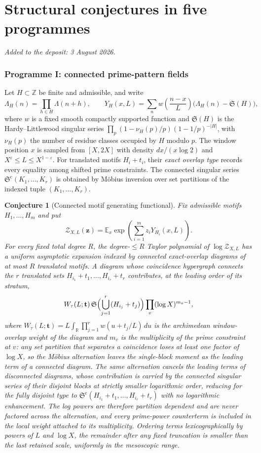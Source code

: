 \documentclass[11pt]{article}
\newtheorem{conjecture}{Conjecture}
\theoremstyle{definition}
\newcommand{\SG}{\mathfrak S}
\newcommand{\E}{\mathbb E}
\newcommand{\Z}{\mathbb Z}
\newcommand{\R}{\mathbb R}
\newcommand{\eps}{\varepsilon}
\providecommand{\Z}{\mathbb Z}
\providecommand{\R}{\mathbb R}
\providecommand{\E}{\mathbb E}
\begin{document}
\part{Structural conjectures in five programmes}

\medskip\noindent\emph{Added to the deposit: 3 August 2026.}\par\medskip

\section{Programme I: connected prime-pattern fields}

Let $H\subset\Z$ be finite and admissible, and write
\[
 \Lambda_H(n)=\prod_{h\in H}\Lambda(n+h),\qquad
 Y_H(x,L)=\sum_n w\!\left(\frac{n-x}{L}\right)
 \bigl(\Lambda_H(n)-\SG(H)\bigr),
\]
where $w$ is a fixed smooth compactly supported function and $\SG(H)$ is the
Hardy--Littlewood singular series
$\prod_p(1-\nu_H(p)/p)(1-1/p)^{-|H|}$, with $\nu_H(p)$ the number of residue
classes occupied by $H$ modulo $p$.  The window position $x$ is
sampled from $[X,2X]$ with density $dx/(x\log2)$ and
$X^\eps\le L\le X^{1-\eps}$.  For translated motifs $H_i+t_i$, their \emph{exact
overlap type} records every equality among shifted prime constraints.  The connected
singular series $\SG^{\mathrm c}(K_1,\ldots,K_r)$ is obtained by M\"obius inversion over
set partitions of the indexed tuple $(K_1,\ldots,K_r)$.

\begin{conjecture}[Connected motif generating functional]\label{s1}
Fix admissible motifs $H_1,\ldots,H_m$ and put
\[
 \mathcal Z_{X,L}(\mathbf z)=
 \E_x\exp\!\left(\sum_{i=1}^m z_iY_{H_i}(x,L)\right).
\]
For every fixed total degree $R$, the degree-$\le R$ Taylor polynomial of
$\log\mathcal Z_{X,L}$ has a uniform asymptotic expansion indexed by connected exact-overlap diagrams of at most $R$ translated motifs.  A diagram whose coincidence hypergraph connects the $r$ translated sets
$H_{i_1}+t_1,\ldots,H_{i_r}+t_r$ contributes, at the leading order of its stratum,
\[
 W_\tau(L;\mathbf t)\,
 \SG\Bigl(\bigcup_{j=1}^r(H_{i_j}+t_j)\Bigr)
 \prod_v(\log X)^{m_v-1},
\]
where $W_\tau(L;\mathbf t)=L\int_{\R}\prod_{j=1}^rw(u+t_j/L)\,du$ is the
archimedean window-overlap weight of the diagram and
$m_v$ is the multiplicity of the prime constraint at $v$: any set partition that
separates a coincidence loses at least one factor of $\log X$, so the M\"obius
alternation leaves the single-block moment as the leading term of a connected diagram.
The same alternation cancels the leading terms of disconnected diagrams, whose
contribution is carried by the connected singular series of their disjoint blocks at
strictly smaller logarithmic order, reducing for the fully disjoint type to
$\SG^{\mathrm c}(H_{i_1}+t_1,\ldots,H_{i_r}+t_r)$ with no logarithmic enhancement.
The log powers are therefore partition dependent and are never factored across the
alternation, and every prime-power counterterm is included in the local weight attached
to its multiplicity.  Ordering
terms lexicographically by powers of $L$ and $\log X$, the remainder after any fixed
truncation is smaller than the last retained scale, uniformly in the mesoscopic range.
\end{conjecture}
\end{document}
